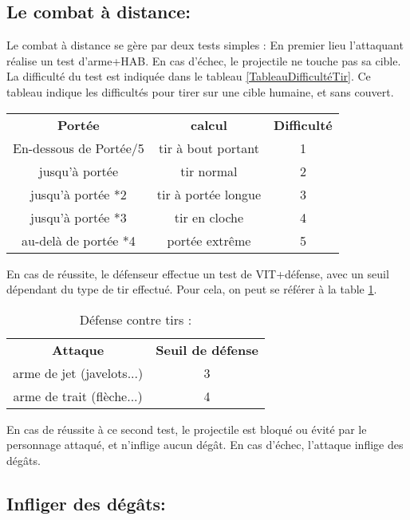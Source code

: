 \documentclass[10pt,a4paper,twocolumn]{book}
\begin{document}
\subsection{Le combat à distance:}
Le combat à distance se gère par deux tests simples :
En premier lieu l’attaquant réalise un test d’arme+HAB. En cas d’échec, le projectile ne touche pas sa cible. La difficulté du test est indiquée dans le tableau \ref{TableauDifficultéTir}. Ce tableau indique les difficultés pour tirer sur une cible humaine, et sans couvert.
\begin{table*}
\caption{Difficultés de tir}
\label{TableauDifficultéTir}
\begin{center}
\begin{tabular}{ccc}
\textbf{Portée} & \textbf{calcul}& \textbf{Difficulté} \\
   En-dessous de Portée/5 & tir à bout portant & 1  \\
   jusqu'à portée & tir normal & 2 \\
jusqu'à portée *2 & tir à portée longue & 3 \\
jusqu'à portée *3 & tir en cloche & 4 \\
au-delà de portée *4 & portée extrême & 5
\end{tabular}
\end{center}
\end{table*}

En cas de réussite, le défenseur effectue un test de VIT+défense, avec un seuil dépendant du type de tir effectué. Pour cela, on peut se référer à la table \ref{tableDiffContreTirs}.

\begin{table}
\caption{ Défense contre tirs :}
\label{tableDiffContreTirs}
\begin{center}
\begin{tabular}{cc}
\textbf{Attaque} & \textbf{Seuil de défense} \\
   arme de jet (javelots...) & 3\\
   arme de trait (flèche...) & 4\\
\end{tabular}
\end{center}
\end{table}
En cas de réussite à ce second test, le projectile est bloqué ou évité par le personnage attaqué, et n’inflige aucun dégât. 
En cas d’échec, l’attaque inflige des dégâts.
\subsection{Infliger des dégâts:}
\end{document}
